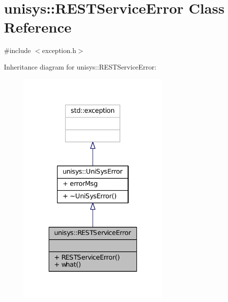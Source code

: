 \hypertarget{classunisys_1_1RESTServiceError}{\section{unisys\-:\-:R\-E\-S\-T\-Service\-Error Class Reference}
\label{classunisys_1_1RESTServiceError}
}


{\ttfamily \#include $<$exception.\-h$>$}



Inheritance diagram for unisys\-:\-:R\-E\-S\-T\-Service\-Error\-:
\nopagebreak
\begin{figure}[H]
\begin{center}
\leavevmode
\includegraphics[width=214pt]{classunisys_1_1RESTServiceError__inherit__graph}
\end{center}
\end{figure}


